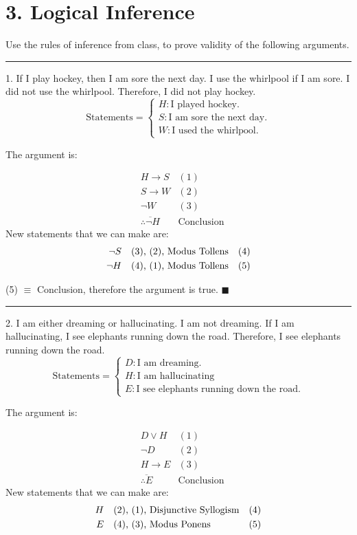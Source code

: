 \documentclass[]{article}
\begin{document}
\section*{3. Logical Inference}
Use the rules of inference from class, to prove validity of the following arguments.
\hrule
\vspace{0.1in}
1. If I play hockey, then I am sore the next day. I use the whirlpool if I am sore. I did not use
the whirlpool. Therefore, I did not play hockey.
\[
    \text{Statements} = 
    \begin{cases*}
         H: \text{I played hockey.} \\
         S: \text{I am sore the next day.} \\
         W: \text{I used the whirlpool.}
    \end{cases*}
\]

The argument is:

\begin{align*}
    & H \rightarrow S & (1)\\
    & S \rightarrow W & (2)\\
    & \neg W  & (3) \\
    & \overline{\therefore \neg H} & \text{Conclusion}
\end{align*}
New statements that we can make are:
\begin{align*}
    \neg S \quad & \text{(3), (2), Modus Tollens} \hfill & (4) \\
    \neg H \quad & \text{(4), (1), Modus Tollens} \hfill & (5) \\
\end{align*}

\begin{center}
    (5) $\equiv$ Conclusion, therefore the argument is true. $\blacksquare$
\end{center}
\hrule
\vspace{0.1in}
2. I am either dreaming or hallucinating. I am not dreaming. If I am hallucinating, I see elephants
running down the road. Therefore, I see elephants running down the road.
\[
    \text{Statements} = 
    \begin{cases*}
         D: \text{I am dreaming.} \\
         H: \text{I am hallucinating} \\
         E: \text{I see elephants running down the road.}
    \end{cases*}
\]

The argument is:

\begin{align*}
    & D \lor H & (1)\\
    & \neg D & (2)\\
    & H \rightarrow E  & (3) \\
    & \overline{\therefore  E} & \text{Conclusion}
\end{align*}
New statements that we can make are:
\begin{align*}
    H \quad & \text{(2), (1), Disjunctive Syllogism} \hfill & (4) \\
    E \quad & \text{(4), (3), Modus Ponens} \hfill & (5) \\
\end{align*}
\end{document}
